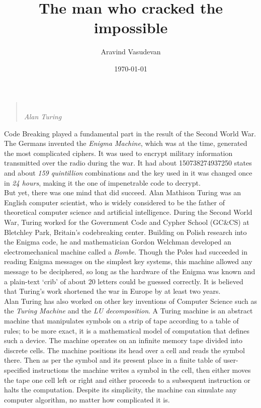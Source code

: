 \documentclass[12pt, a4paper, notitlepage, oneside]{article}
\author{Aravind Vasudevan}
\date{{\small \today}}
\title{{\Huge The man who cracked the impossible}}
\begin{document}

\maketitle


\begin{quote} 
\centering 
\emph{} \\ \textemdash \hspace{2mm} \textit{Alan Turing}
\end{quote}
\vspace*{2em}

Code Breaking played a fundamental part in the result of the Second World War. The Germans invented the \emph{Enigma Machine}, which was at the time, generated the most complicated ciphers. It was used to encrypt military information transmitted over the radio during the war. It had about \num{150738274937250} states and about \emph{159 quintillion} combinations and the key used in it was changed once in \emph{\num{24} hours}, making it the one of impenetrable code to decrypt. \\

But yet, there was one mind that did succeed. Alan Mathison Turing was an English computer scientist, who is widely considered to be the father of theoretical computer science and artificial intelligence. During the Second World War, Turing worked for the Government Code and Cypher School (GC\&CS) at Bletchley Park, Britain's codebreaking center. Building on Polish research into the Enigma code, he and mathematician Gordon Welchman developed an electromechanical machine called a \textit{Bombe}. Though the Poles had succeeded in reading Enigma messages on the simplest key systems, this machine allowed any message to be deciphered, so long as the hardware of the Enigma was known and a plain-text ‘crib’ of about 20 letters could be guessed correctly. It is believed that Turing’s work shortened the war in Europe by at least two years. \\

Alan Turing has also worked on other key inventions of Computer Science such as the \emph{Turing Machine} and the \emph{LU decomposition}. A Turing machine is an abstract machine that manipulates symbols on a strip of tape according to a table of rules; to be more exact, it is a mathematical model of computation that defines such a device. The machine operates on an infinite memory tape divided into discrete cells. The machine positions its head over a cell and reads the symbol there. Then as per the symbol and its present place in a finite table of user-specified instructions the machine writes a symbol in the cell, then either moves the tape one cell left or right and either proceeds to a subsequent instruction or halts the computation. Despite its simplicity, the machine can simulate any computer algorithm, no matter how complicated it is. \\
\end{document}
